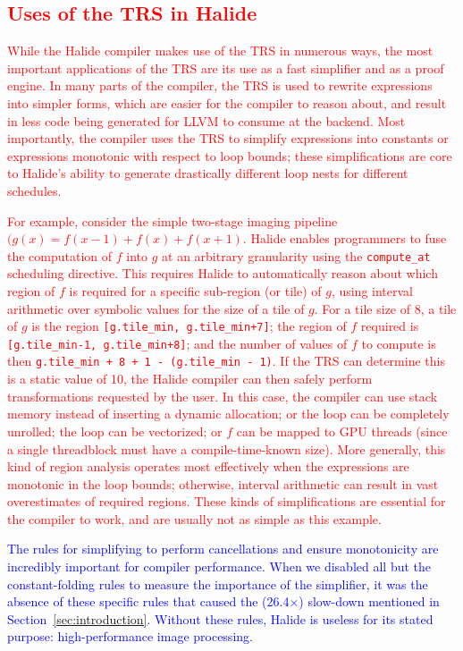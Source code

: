 \documentclass[acmsmall,review]{acmart}\settopmatter{printfolios=true,printccs=false,printacmref=false}
\newcommand{\modified}[1]{\textcolor{red}{{#1}}}
\newcommand{\modifiedagain}[1]{\textcolor{blue}{{#1}}}
\begin{document}
\subsection{\modified{Uses of the TRS in Halide}}
\label{sec:uses-of-trs}
\modified{While the Halide compiler makes use of the TRS in numerous ways, the most important
  applications of the TRS are its use as a fast simplifier and as a proof engine.  
  In many parts of the compiler, the TRS is used to rewrite expressions into simpler forms,
  which are easier for the compiler to reason about, and result in less code being generated for
  LLVM to consume at the backend.  Most importantly, the compiler uses the TRS to simplify expressions
  into constants or expressions monotonic with respect to loop bounds; these simplifications are core to Halide's
  ability to generate drastically different loop nests for different schedules.}

\modified{For example, consider the simple two-stage imaging pipeline $(g(x) = f(x - 1) + f(x) + f(x + 1)$.
  Halide enables programmers to fuse the computation of $f$ into $g$ at an arbitrary granularity
  using the \texttt{compute\_at} scheduling directive.  This requires Halide to automatically reason
  about which region of $f$ is required for a specific sub-region (or tile) of $g$, using interval
  arithmetic over symbolic values for the size of a tile of $g$.  For a tile size of 8, a tile of $g$
  is the region \texttt{[g.tile\_min, g.tile\_min+7]};  the region of $f$ required is
  \texttt{[g.tile\_min-1, g.tile\_min+8]}; and the number of values of $f$ to compute is then
  \texttt{g.tile\_min + 8 + 1 - (g.tile\_min - 1)}.  If the TRS can determine this is a static value
  of 10, the Halide compiler can then safely perform transformations requested by the user.  In this
  case, the compiler can use stack memory instead of inserting a dynamic allocation; or the loop can be
  completely unrolled; the loop can be vectorized; or $f$ can be mapped to GPU threads (since a single
  threadblock must have a compile-time-known size).  More generally, this kind of region analysis
  operates most effectively when the expressions are monotonic in the loop bounds; otherwise, interval
  arithmetic can result in vast overestimates of required regions.  These kinds of simplifications are essential
  for the compiler to work, and are usually not as simple as this example.}

\modifiedagain{The rules for simplifying to perform cancellations and
  ensure monotonicity are incredibly important for compiler
  performance. When we disabled all but the constant-folding rules to
  measure the importance of the simplifier, it was the absence of
  these specific rules that caused the (26.4$\times$) slow-down
  mentioned in Section~\ref{sec:introduction}. Without these rules,
  Halide is useless for its stated purpose: high-performance image
  processing.}
\end{document}
